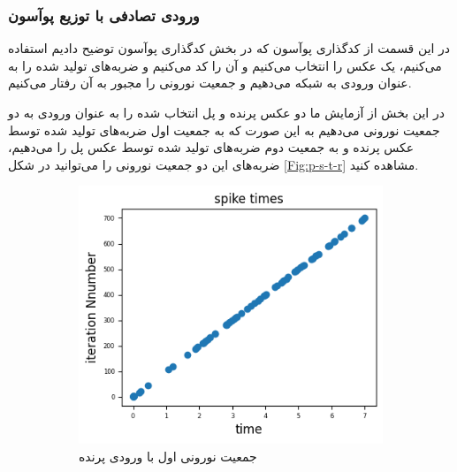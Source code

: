 \documentclass[12pt]{article}
\begin{document}
\subsubsection{ورودی تصادفی با توزیع پوآسون}
در این قسمت از کدگذاری پوآسون که در بخش کدگذاری پوآسون توضیح دادیم استفاده می‌کنیم، یک عکس را انتخاب می‌کنیم و آن را کد می‌کنیم و ضربه‌های تولید شده را به عنوان ورودی به شبکه می‌دهیم و جمعیت نورونی را مجبور به آن رفتار می‌کنیم.

در این بخش از آزمایش ما دو عکس پرنده و پل انتخاب شده را به عنوان ورودی به دو جمعیت نورونی می‌دهیم به این صورت که به جمعیت اول ضربه‌های تولید شده توسط عکس پرنده و به جمعیت دوم ضربه‌های تولید شده توسط عکس پل را می‌دهیم، ضربه‌های این دو جمعیت نورونی را می‌توانید در شکل \ref{Fig:p-s-t-r} مشاهده کنید.


\begin{figure}[H]
\centering
  \begin{subfigure}[b]{0.30\textwidth}
    \includegraphics[width=\textwidth]{Figs/ng1-s-t-r2.png}
    \caption{جمعیت نورونی اول با ورودی پرنده}
  \end{subfigure}
  \hspace*{40}
  \begin{subfigure}[b]{0.30\textwidth}

\end{subfigure}
\end{figure}
\end{document}
